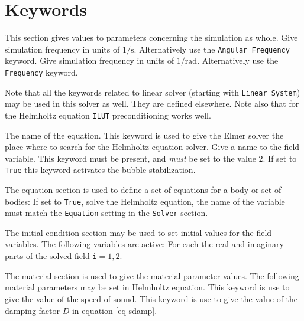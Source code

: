 \section{Keywords} 

\sifbegin

This section gives values to parameters concerning the simulation
as whole.
\sifbegin
{}
Give simulation frequency in units of $1/\mathrm{s}$.
Alternatively use the {\tt Angular Frequency} keyword.
Give simulation frequency in units of $1/\mathrm{rad}$.
Alternatively use the {\tt Frequency} keyword.
\sifend

Note that all the keywords related to linear solver (starting
with {\tt Linear System})
may be used in this solver as well.  They are defined elsewhere. 
Note also that for the Helmholtz equation {\tt ILUT} preconditioning
works well.

\sifbegin
{} 
The name of the equation.
This keyword is used to give the Elmer solver the place where
to search for the Helmholtz equation solver.
Give a name to the field variable.
This keyword must be present, and {\it must} be set to the value $2$.
If set to {\tt True} this keyword activates the bubble stabilization.
\sifend

The equation section is used to define a set of equations for a body or set of bodies:
\sifbegin
{} If set to {\tt True}, solve the Helmholtz equation,
the name of the variable must match the {\tt Equation} setting in the {\tt Solver} section.
\sifend


The initial condition section may be used to set initial values for the field
variables. The following variables are active:
\sifbegin
{} 
For each the real and imaginary parts of the solved field {\tt i}$=1,2$.
\sifend

The material section is used to give the material parameter values. The
following material parameters may be set in Helmholtz equation.
\sifbegin
{} 
This keyword is use to give the value of the speed of sound.
This keyword is use to give the value of the damping factor $D$ in
equation \ref{eq-sdamp}.
\sifend



